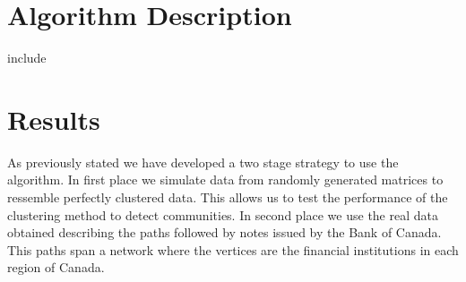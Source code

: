 \documentclass[11pt,letter]{article}%
\numberwithin{equation}{section}
\begin{document}



\section{Algorithm Description}
include
\section{Results}

As previously stated we have developed a two stage strategy to use the algorithm. In first place we simulate data from randomly generated matrices to ressemble perfectly clustered data. This allows us to test the performance of the clustering method to detect communities. In second place we use the real data obtained describing the paths followed by notes issued by the Bank of Canada. This paths span a network where the vertices are the financial institutions in each region of Canada.
\end{document}
